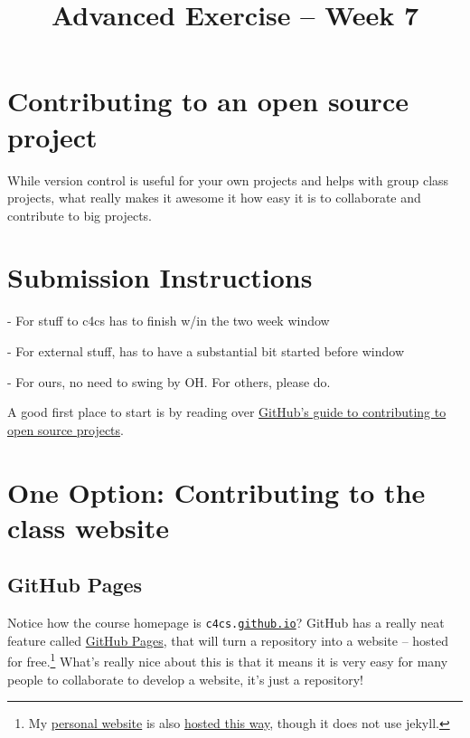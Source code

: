 \documentclass{article}
\begin{document}
\fancyfoot[C]{\color{gray} \thepage~/~\pageref*{LastPage}}
\pagestyle{fancyplain}


\title{\textbf{Advanced Exercise -- Week 7\\}}
\author{\textbf{\color{red}{Due: Before November 5, 10:00PM}}}
\date{}
\maketitle


\section*{Contributing to an open source project}

While version control is useful for your own projects and helps with group
class projects, what really makes it awesome it how easy it is to collaborate
and contribute to big projects.

\section*{Submission Instructions}

 - For stuff to c4cs has to finish w/in the two week window

 - For external stuff, has to have a substantial bit started before window

 - For ours, no need to swing by OH. For others, please do.

\begin{mdframed}\centering
A good first place to start is by reading over
\href{https://guides.github.com/activities/contributing-to-open-source/#contributing}{GitHub's
  guide to contributing to open source projects}.
\end{mdframed}

\newpage

\section*{One Option: Contributing to the class website}

\subsection*{GitHub Pages}

Notice how the course homepage is \texttt{c4cs.\ul{github.io}}? GitHub has a
really neat feature called \href{https://pages.github.com/}{GitHub Pages},
that will turn a repository into a website -- hosted for free.\footnote{%
  My \href{https://github.com/ppannuto/patpannuto.com}{personal website} is also
  \href{https://github.com/ppannuto/ppannuto.github.io}{hosted this way},
  though it does not use jekyll.
} What's really nice about this is that it means it is very easy for many
people to collaborate to develop a website, it's just a repository!
\end{document}
